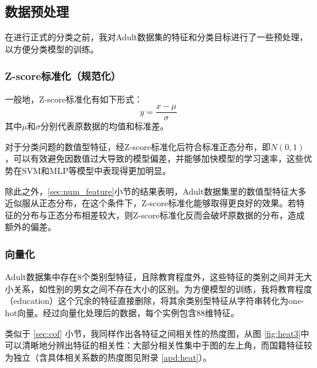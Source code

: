 \documentclass[12pt,a4paper]{article}
\theoremstyle{definition}
\begin{document}
\subsection{数据预处理}

在进行正式的分类之前，我对Adult数据集的特征和分类目标进行了一些预处理，以方便分类模型的训练。

\subsubsection{Z-score标准化（规范化）}

一般地，Z-score标准化有如下形式：
\begin{equation}
	y = \dfrac{x - \mu}{\sigma}
\end{equation}
其中$\mu$和$\sigma$分别代表原数据的均值和标准差。

\vspace{0.01\linewidth}
对于分类问题的数值型特征，经Z-score标准化后符合标准正态分布，即$N(0, 1)$，可以有效避免因数值过大导致的模型偏差，并能够加快模型的学习速率，这些优势在SVM和MLP等模型中表现得更加明显。

\vspace{0.01\linewidth}
除此之外，\ref{sec:num_feature}小节的结果表明，Adult数据集里的数值型特征大多近似服从正态分布，在这个条件下，Z-score标准化能够取得更良好的效果。若特征的分布与正态分布相差较大，则Z-score标准化反而会破坏原数据的分布，造成额外的偏差。

\subsubsection{向量化}

Adult数据集中存在8个类别型特征，且除教育程度外，这些特征的类别之间并无大小关系，如性别的男女之间不存在大小的区别。为方便模型的训练，我将教育程度（education）这个冗余的特征直接删除，将其余类别型特征从字符串转化为one-hot向量。经过向量化处理后的数据，每个实例包含88维特征。

\vspace{0.01\linewidth}
类似于 \ref{sec:cof} 小节，我同样作出各特征之间相关性的热度图，从图 \ref{fig:heat3}中可以清晰地分辨出特征的相关性：大部分相关性集中于图的左上角，而国籍特征较为独立（含具体相关系数的热度图见附录 \ref{apd:heat}）。
\end{document}
